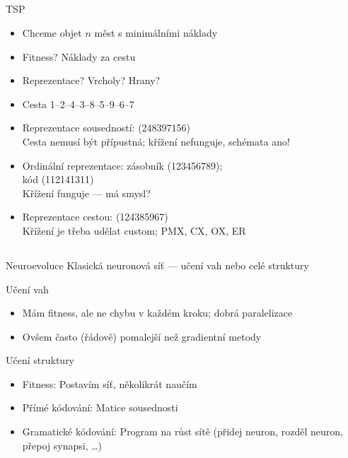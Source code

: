 \documentclass{beamer}
\begin{document}
\subsection{}
\begin{frame}{TSP}
\begin{itemize}
\item Chceme objet $n$ měst s minimálními náklady
\item Fitness? \pause Náklady za cestu
\item Reprezentace? \pause Vrcholy? Hrany? \pause
\item Cesta 1--2--4--3--8--5--9--6--7
\item Reprezentace sousedností: (248397156) \\
	Cesta nemusí být přípustná; křížení nefunguje, schémata ano!
\item Ordinální reprezentace: zásobník (123456789); \\ kód (112141311) \\
	Křížení funguje --- má smysl?
\item Reprezentace cestou: (124385967) \\
	Křížení je třeba udělat custom; PMX, CX, OX, ER
\end{itemize}
\end{frame}

\subsection{}
\begin{frame}{Neuroevoluce}
Klasická neuronová síť --- učení vah nebo celé struktury

\begin{block}{Učení vah}
\begin{itemize}
\item Mám fitness, ale ne chybu v každém kroku; dobrá paralelizace
\item Ovšem často (řádově) pomalejší než gradientní metody
\end{itemize}
\end{block}

\begin{block}{Učení struktury}
\begin{itemize}
\item Fitness: Postavím síť, několikrát naučím
\item Přímé kódování: Matice sousednosti
\item Gramatické kódování: Program na růst sítě (přidej neuron, rozděl neuron, přepoj synapsi, \dots)
\end{itemize}
\end{block}
\end{frame}
\end{document}
